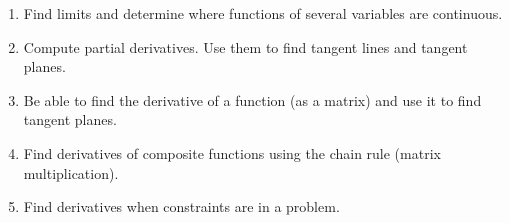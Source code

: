 
\begin{enumerate}
\item Find limits and determine where functions of several variables
  are continuous.
\item Compute partial derivatives.  Use them to find tangent lines and
  tangent planes.
\item Be able to find the derivative of a function (as a matrix) and
  use it to find tangent planes.
\item Find derivatives of composite functions using the chain rule
  (matrix multiplication).
\item Find derivatives when constraints are in a problem.
\end{enumerate}

